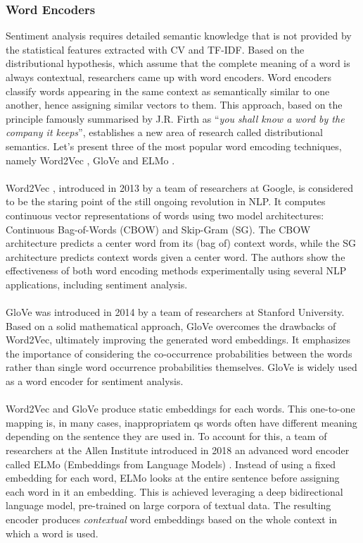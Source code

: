 \documentclass[final]{cvpr}
\begin{document}
\subsubsection{Word Encoders}

Sentiment analysis requires detailed semantic knowledge that is not provided by the statistical features extracted with CV and TF-IDF. Based on the distributional hypothesis, which assume that the complete meaning of a word is always contextual, researchers came up with word encoders. Word encoders classify words appearing in the same context as semantically similar to one another, hence assigning similar vectors to them. This approach, based on the principle famously summarised by J.R. Firth as “\textit{you shall know a word by the company it keeps}”, establishes a new area of research called distributional semantics. Let's present three of the most popular word emcoding techniques, namely Word2Vec \cite{word2vec}, GloVe \cite{glove} and ELMo \cite{elmo}.\\
\\
Word2Vec \cite{word2vec}, introduced in 2013 by a team of researchers at Google, is considered to be the staring point of the still ongoing revolution in NLP. It computes continuous vector representations of words using two model architectures: Continuous Bag-of-Words (CBOW) and Skip-Gram (SG). The CBOW architecture predicts a center word from its (bag of) context words, while the SG architecture predicts context words given a center word. The authors show the effectiveness of both word encoding methods experimentally using several NLP applications, including sentiment analysis.\\
\\
GloVe \cite{glove} was introduced in 2014 by a team of researchers at Stanford University. Based on a solid mathematical approach, GloVe overcomes the drawbacks of Word2Vec, ultimately improving the generated word embeddings. It emphasizes the importance of considering the co-occurrence probabilities between the words rather than single word occurrence probabilities themselves. GloVe is widely used as a word encoder for sentiment analysis.\\
\\
Word2Vec and GloVe produce static embeddings for each words. This one-to-one mapping is, in many cases, inappropriatem qs words often have different meaning depending on the sentence they are used in. To account for this, a team of researchers at the Allen Institute introduced in 2018 an advanced word encoder called ELMo (Embeddings from Language Models) \cite{elmo}. Instead of using a fixed embedding for each word, ELMo looks at the entire sentence before assigning each word in it an embedding. This is achieved leveraging a deep bidirectional language model, pre-trained on large corpora of textual data. The resulting encoder produces \textit{contextual} word embeddings based on the whole context in which a word is used.\\
\end{document}
